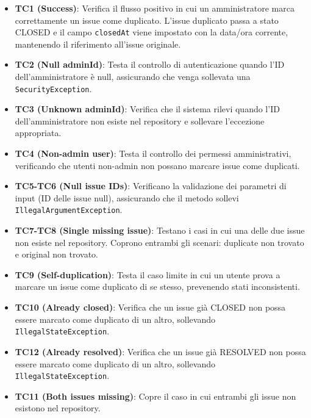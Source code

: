 ﻿\documentclass[11pt,a4paper]{article}
\begin{document}
\begin{itemize}
    \item \textbf{TC1 (Success)}: Verifica il flusso positivo in cui un amministratore marca correttamente un issue come duplicato. L'issue duplicato passa a stato CLOSED e il campo \texttt{closedAt} viene impostato con la data/ora corrente, mantenendo il riferimento all'issue originale.
    
    \item \textbf{TC2 (Null adminId)}: Testa il controllo di autenticazione quando l'ID dell'amministratore è null, assicurando che venga sollevata una \texttt{SecurityException}.
    
    \item \textbf{TC3 (Unknown adminId)}: Verifica che il sistema rilevi quando l'ID dell'amministratore non esiste nel repository e sollevare l'eccezione appropriata.
    
    \item \textbf{TC4 (Non-admin user)}: Testa il controllo dei permessi amministrativi, verificando che utenti non-admin non possano marcare issue come duplicati.
    
    \item \textbf{TC5-TC6 (Null issue IDs)}: Verificano la validazione dei parametri di input (ID delle issue null), assicurando che il metodo sollevi \texttt{IllegalArgumentException}.
    
    \item \textbf{TC7-TC8 (Single missing issue)}: Testano i casi in cui una delle due issue non esiste nel repository. Coprono entrambi gli scenari: duplicate non trovato e original non trovato.
    
    \item \textbf{TC9 (Self-duplication)}: Testa il caso limite in cui un utente prova a marcare un issue come duplicato di se stesso, prevenendo stati inconsistenti.
    
    \item \textbf{TC10 (Already closed)}: Verifica che un issue già CLOSED non possa essere marcato come duplicato di un altro, sollevando \texttt{IllegalStateException}.
    
    \item \textbf{TC12 (Already resolved)}: Verifica che un issue già RESOLVED non possa essere marcato come duplicato di un altro, sollevando \texttt{IllegalStateException}.
    
    \item \textbf{TC11 (Both issues missing)}: Copre il caso in cui entrambi gli issue non esistono nel repository.
\end{itemize}
\end{document}
